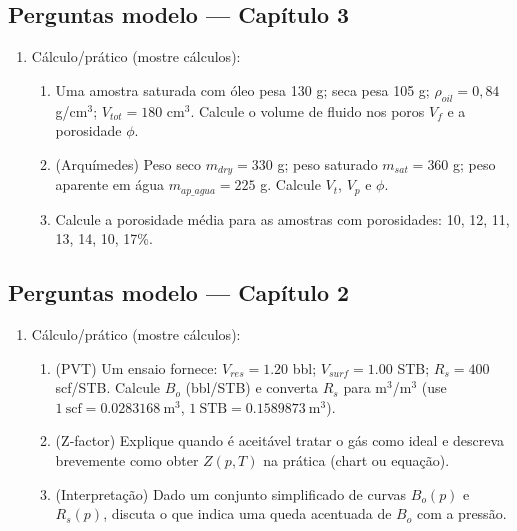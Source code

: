 \documentclass[11pt,a4paper]{article}
\begin{document}
\clearpage
\subsection{Perguntas modelo — Capítulo 3}
\begin{enumerate}
\item Cálculo/prático (mostre cálculos):
\begin{enumerate}[label=\alph*)]
\item Uma amostra saturada com óleo pesa 130 g; seca pesa 105 g; $\rho_{oil}=0{,}84$ g/cm$^3$; $V_{tot}=180$ cm$^3$. Calcule o volume de fluido nos poros $V_f$ e a porosidade $\phi$.\\[2\baselineskip]
\item (Arquímedes) Peso seco $m_{dry}=330$ g; peso saturado $m_{sat}=360$ g; peso aparente em água $m_{ap\_agua}=225$ g. Calcule $V_t$, $V_p$ e $\phi$.\\[2\baselineskip]
\item Calcule a porosidade média para as amostras com porosidades: 10, 12, 11, 13, 14, 10, 17\%.
\end{enumerate}
\end{enumerate}

\subsection{Perguntas modelo — Capítulo 2}
\begin{enumerate}
\item Cálculo/prático (mostre cálculos):
\begin{enumerate}[label=\alph*)]
\item (PVT) Um ensaio fornece: $V_{res}=1.20$ bbl; $V_{surf}=1.00$ STB; $R_s=400$ scf/STB. Calcule $B_o$ (bbl/STB) e converta $R_s$ para m$^3$/m$^3$ (use $1\ \text{scf}=0.0283168\ \text{m}^3$, $1\ \text{STB}=0.1589873\ \text{m}^3$).\\[2\baselineskip]
\item (Z‑factor) Explique quando é aceitável tratar o gás como ideal e descreva brevemente como obter $Z(p,T)$ na prática (chart ou equação).
\item (Interpretação) Dado um conjunto simplificado de curvas $B_o(p)$ e $R_s(p)$, discuta o que indica uma queda acentuada de $B_o$ com a pressão.
\end{enumerate}
\end{enumerate}
\end{document}
